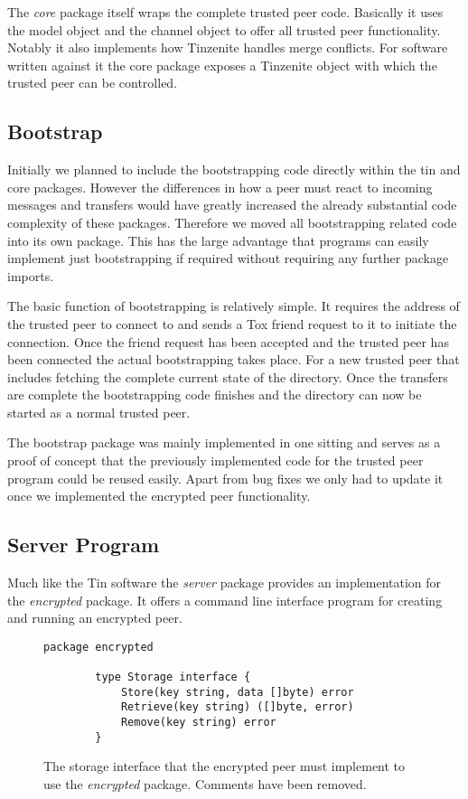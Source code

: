 The \emph{core} package itself wraps the complete trusted peer code.
Basically it uses the model object and the channel object to offer all trusted peer functionality.
Notably it also implements how Tinzenite handles merge conflicts.
For software written against it the core package exposes a Tinzenite object with which the trusted peer can be controlled.

\subsection{Bootstrap}
\label{sub:Bootstrap}

Initially we planned to include the bootstrapping code directly within the tin and core packages.
However the differences in how a peer must react to incoming messages and transfers would have greatly increased the already substantial code complexity of these packages.
Therefore we moved all bootstrapping related code into its own package.
This has the large advantage that programs can easily implement just bootstrapping if required without requiring any further package imports.

The basic function of bootstrapping is relatively simple.
It requires the address of the trusted peer to connect to and sends a Tox friend request to it to initiate the connection.
Once the friend request has been accepted and the trusted peer has been connected the actual bootstrapping takes place.
For a new trusted peer that includes fetching the complete current state of the directory.
Once the transfers are complete the bootstrapping code finishes and the directory can now be started as a normal trusted peer.

The bootstrap package was mainly implemented in one sitting and serves as a proof of concept that the previously implemented code for the trusted peer program could be reused easily.
Apart from bug fixes we only had to update it once we implemented the encrypted peer functionality.

\subsection{Server Program}
\label{sub:Server Program}

Much like the Tin software the \emph{server} package provides an implementation for the \emph{encrypted} package.
It offers a command line interface program for creating and running an encrypted peer.

\begin{figure}[htp]
    \begin{lstlisting}[language=golang,firstnumber=0]
        package encrypted

        type Storage interface {
        	Store(key string, data []byte) error
        	Retrieve(key string) ([]byte, error)
        	Remove(key string) error
        }
    \end{lstlisting}
\caption[Encrypted Storage Interface]{The storage interface that the encrypted peer must implement to use the \emph{encrypted} package. Comments have been removed.}
\label{golang:storage_interface}
\end{figure}

